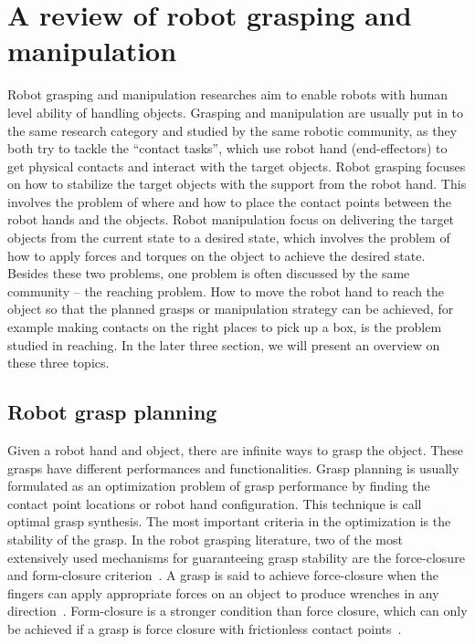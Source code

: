 \section{A review of robot grasping and manipulation}
\label{cha2:sec1}

Robot grasping and manipulation researches aim to enable robots with human level ability of handling objects. Grasping and manipulation are usually put in to the same research category and studied by the same robotic community, as they both try to tackle the ``contact tasks'', which  use robot hand (end-effectors) to get physical contacts and interact with the target objects.
Robot grasping focuses on how to stabilize the target objects with the support from the robot hand. This involves the problem of where and how to place the contact points between the robot hands and the objects. Robot manipulation focus on delivering the target objects from the current state to a desired state, which involves the problem of how to apply forces and torques on the object to achieve the desired state. Besides these two problems, one problem is often discussed by the same community -- the reaching problem. How to move the robot hand to reach the object so that the planned grasps or manipulation strategy can be achieved, for example making contacts on the right places to pick up a box, is the problem studied in reaching. In the later three section, we will present an overview on these three topics.

\subsection{Robot grasp planning}
\label{cha2:sec1:planning}

Given a robot hand and object, there are infinite ways to grasp the object. These grasps have different performances and functionalities. Grasp planning is usually formulated as an optimization problem of grasp performance by finding the contact point locations or robot hand configuration. This technique is call optimal grasp synthesis. The most important criteria in the optimization is the stability of the grasp. In the robot grasping literature, two of the most extensively used mechanisms for guaranteeing grasp stability are the force-closure and form-closure criterion~\citep{Nguyen87}. A grasp is said to achieve force-closure when the fingers can apply appropriate forces on an object to produce wrenches in any direction~\citep{SalisburyJr1985}. Form-closure is a stronger condition than force closure, which can only be achieved if a grasp is force closure with frictionless contact points~\citep{diziouglu1984mechanics}.

